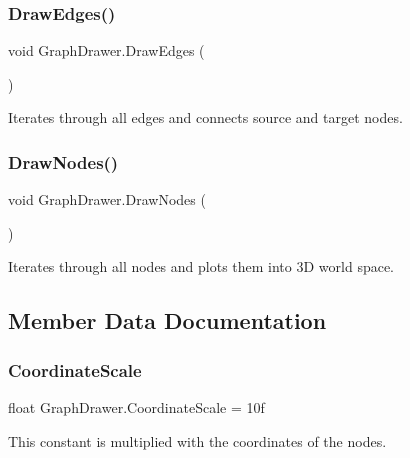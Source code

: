 \subsubsection{\texorpdfstring{DrawEdges()}{DrawEdges()}}
{\footnotesize\ttfamily void Graph\+Drawer.\+Draw\+Edges (\begin{DoxyParamCaption}{ }\end{DoxyParamCaption})\hspace{0.3cm}{\ttfamily [inline]}}



Iterates through all edges and connects source and target nodes. 

\mbox{\label{class_graph_drawer_a3aabb356d594c77af566191bc7869eff}} 
\subsubsection{\texorpdfstring{DrawNodes()}{DrawNodes()}}
{\footnotesize\ttfamily void Graph\+Drawer.\+Draw\+Nodes (\begin{DoxyParamCaption}{ }\end{DoxyParamCaption})\hspace{0.3cm}{\ttfamily [inline]}}



Iterates through all nodes and plots them into 3D world space. 



\subsection{Member Data Documentation}
\mbox{\label{class_graph_drawer_a0a09edfeab5c988ee4ed2e335b0897e7}} 
\subsubsection{\texorpdfstring{CoordinateScale}{CoordinateScale}}
{\footnotesize\ttfamily float Graph\+Drawer.\+Coordinate\+Scale = 10f}



This constant is multiplied with the coordinates of the nodes. 

\mbox{\label{class_graph_drawer_a1264583a4ab9461d51c53c78ca12c5fa}} 
